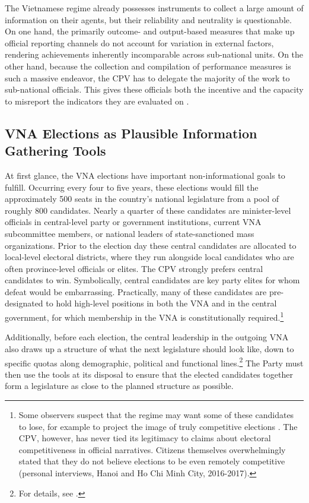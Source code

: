 \documentclass[12pt]{article}
\newcommand\fnote[1]{\footnote{\baselineskip=2\normalbaselineskip#1}}
\newcommand{\1}{\mathbbm{1}}
\begin{document}
The Vietnamese regime already possesses instruments to collect a large amount of information on their agents, but their reliability and neutrality is questionable. On one hand, the primarily outcome- and output-based measures that make up official reporting channels do not account for variation in external factors, rendering achievements inherently incomparable across sub-national units. On the other hand, because the collection and compilation of performance measures is such a massive endeavor, the CPV has to delegate the majority of the work to sub-national officials. This gives these officials both the incentive and the capacity to misreport the indicators they are evaluated on \citep[][Ch. 8]{JensenMalesky2018}.

\subsection{VNA Elections as Plausible Information Gathering Tools}

At first glance, the VNA elections have important non-informational goals to fulfill. Occurring every four to five years, these elections would fill the approximately 500 seats in the country's national legislature from a pool of roughly 800 candidates. Nearly a quarter of these candidates are minister-level officials in central-level party or government institutions, current VNA subcommittee members, or national leaders of state-sanctioned mass organizations. Prior to the election day these central candidates are allocated to local-level electoral districts, where they run alongside local candidates who are often province-level officials or elites. The CPV strongly prefers central candidates to win. Symbolically, central candidates are key party elites for whom defeat would be embarrassing. Practically, many of these candidates are pre-designated to hold high-level positions in both the VNA and in the central government, for which membership in the VNA is constitutionally required.\fnote{Some observers suspect that the regime may want some of these candidates to lose, for example to project the image of truly competitive elections \citep{Morgenbesser2016}. The CPV, however, has never tied its legitimacy to claims about electoral competitiveness in official narratives. Citizens themselves overwhelmingly stated that they do not believe elections to be even remotely competitive (personal interviews, Hanoi and Ho Chi Minh City, 2016-2017).}

Additionally, before each election, the central leadership in the outgoing VNA also draws up a structure of what the next legislature should look like, down to specific quotas along demographic, political and functional lines.\fnote{For details, see \citet{MaleskySchuler2009}.} The Party must then use the tools at its disposal to ensure that the elected candidates together form a legislature as close to the planned structure as possible.
\end{document}

